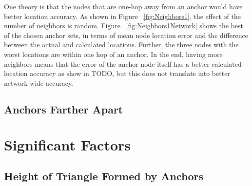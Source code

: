 One theory is that the nodes that are one-hop away from an anchor would have better location accuracy.  As shown in Figure ~\ref{fig:Neighbors1}, the effect of the number of neighbors is random.  Figure ~\ref{fig:Neighbors1Network} shows the best of the chosen anchor sets, in terms of mean node location error and the difference between the actual and calculated locations.  Further, the three nodes with the worst locations are within one hop of an anchor.  In the end, having more neighbors means that the error of the anchor node itself has a better calculated location accuracy as show in TODO, but this does not translate into better network-wide accuracy.


\subsection{Anchors Farther Apart}


\section{Significant Factors}

\subsection{Height of Triangle Formed by Anchors}

\begin{figure}
  \centering
    \label{fig:Triangle1}
\end{figure}

